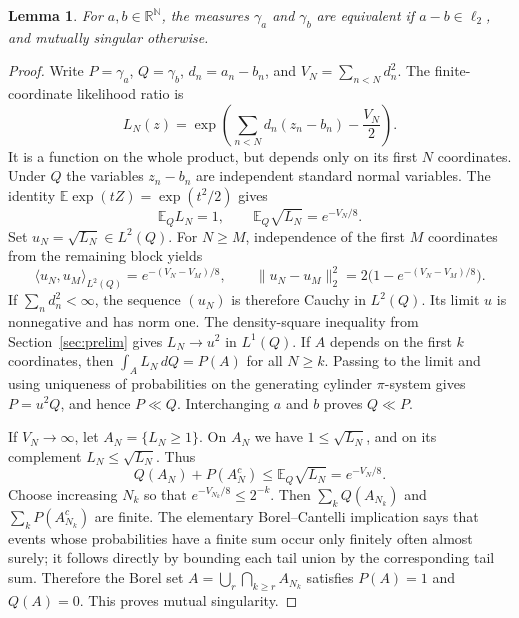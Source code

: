\documentclass[11pt]{article}
\newtheorem{lemma}[theorem]{Lemma}
\theoremstyle{definition}
\newcommand{\N}{\mathbb N}
\newcommand{\R}{\mathbb R}
\newcommand{\E}{\mathbb E}
\begin{document}
\begin{lemma}\label{lem:Gaussian}
For $a,b\in\R^\N$, the measures $\gamma_a$ and $\gamma_b$ are
equivalent if $a-b\in\ell_2$, and mutually singular otherwise.
\end{lemma}
\begin{proof}
Write $P=\gamma_a$, $Q=\gamma_b$, $d_n=a_n-b_n$, and
$V_N=\sum_{n<N}d_n^2$. The finite-coordinate likelihood ratio is
\[
 L_N(z)=\exp\left(\sum_{n<N}d_n(z_n-b_n)-\frac{V_N}{2}\right).
\]
It is a function on the whole product, but depends only on its first
$N$ coordinates. Under $Q$ the variables $z_n-b_n$ are independent
standard normal variables. The identity
$\E\exp(tZ)=\exp(t^2/2)$ gives
\[
 \E_Q L_N=1,\qquad \E_Q\sqrt{L_N}=e^{-V_N/8}.
\]
Set $u_N=\sqrt{L_N}\in L^2(Q)$. For $N\ge M$, independence of the
first $M$ coordinates from the remaining block yields
\[
 \langle u_N,u_M\rangle_{L^2(Q)}=e^{-(V_N-V_M)/8},
 \qquad
 \|u_N-u_M\|_2^2=2\bigl(1-e^{-(V_N-V_M)/8}\bigr).
\]
If $\sum_n d_n^2<\infty$, the sequence $(u_N)$ is therefore Cauchy
in $L^2(Q)$. Its limit $u$ is nonnegative and has norm one.
The density-square inequality from Section~\ref{sec:prelim} gives
$L_N\to u^2$ in $L^1(Q)$. If $A$ depends on the first $k$ coordinates,
then $\int_A L_N\,dQ=P(A)$ for all $N\ge k$. Passing to the limit and
using uniqueness of probabilities on the generating cylinder
$\pi$-system gives $P=u^2Q$, and hence $P\ll Q$. Interchanging $a$
and $b$ proves $Q\ll P$.

If $V_N\to\infty$, let $A_N=\{L_N\ge1\}$. On $A_N$ we have
$1\le\sqrt{L_N}$, and on its complement $L_N\le\sqrt{L_N}$. Thus
\[
 Q(A_N)+P(A_N^c)\le \E_Q\sqrt{L_N}=e^{-V_N/8}.
\]
Choose increasing $N_k$ so that $e^{-V_{N_k}/8}\le2^{-k}$.
Then $\sum_k Q(A_{N_k})$ and $\sum_k P(A_{N_k}^c)$ are finite.
The elementary Borel--Cantelli implication says that events whose
probabilities have a finite sum occur only finitely often almost surely;
it follows directly by bounding each tail union by the corresponding
tail sum. Therefore the Borel set
$A=\bigcup_r\bigcap_{k\ge r}A_{N_k}$ satisfies $P(A)=1$ and $Q(A)=0$.
This proves mutual singularity.
\end{proof}
\end{document}
